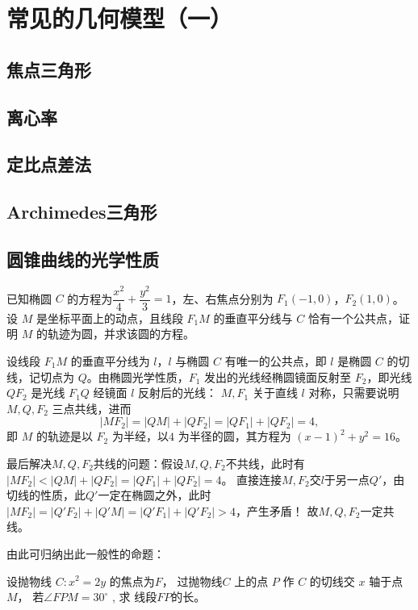 \section{常见的几何模型（一）}
\subsection{焦点三角形}
\clearpage
\subsection{离心率}
\clearpage
\subsection{定比点差法}
\clearpage
\subsection{Archimedes三角形}
\clearpage
\subsection{圆锥曲线的光学性质}
\begin{theorem}[椭圆的光学性质]
    
\end{theorem}
\begin{example}[2025八省联考18]
    已知椭圆 $C$ 的方程为\(\dfrac{x^2}{4}+\dfrac{y^2}{3}=1\)，左、右焦点分别为 $F_1(-1,0)$，$F_2(1,0)$。
  设 $M$ 是坐标平面上的动点，且线段 $F_1M$ 的垂直平分线与 $C$ 恰有一个公共点，证明 $M$ 的轨迹为圆，并求该圆的方程。
\end{example}
\begin{jie}
 设线段 $F_1M$ 的垂直平分线为 $l$，$l$ 与椭圆 $C$ 有唯一的公共点，即 $l$ 是椭圆 $C$ 的切线，记切点为 $Q$。由椭圆光学性质，$F_1$ 发出的光线经椭圆镜面反射至 $F_2$，即光线 $QF_2$ 是光线 $F_1Q$ 经镜面 $l$ 反射后的光线：
$M, F_1$ 关于直线 $l$ 对称，只需要说明$M, Q, F_2$ 三点共线，进而
\[
|MF_2| = |QM| + |QF_2| = |QF_1| + |QF_2| = 4,
\]
即 $M$ 的轨迹是以 $F_2$ 为半经，以$ 4$ 为半径的圆，其方程为 $(x-1)^2 + y^2 = 16$。

最后解决\(M,Q,F_2\)共线的问题：假设\(M,Q,F_2\)不共线，此时有$|MF_2| < |QM| + |QF_2| = |QF_1| + |QF_2| = 4$。
直接连接\(M, F_2\)交\(l\)于另一点\(Q'\)，由切线的性质，此\(Q'\)一定在椭圆之外，此时\(|MF_2|=|Q'F_2|+|Q'M|=|Q'F_1| + |Q'F_2|>4\)，产生矛盾！
故\(M,Q,F_2\)一定共线。
\end{jie}
由此可归纳出此一般性的命题：
\begin{proposition}
    
\end{proposition}
\begin{theorem}[双曲线的光学性质]
    
\end{theorem}
\begin{theorem}[抛物线的光学性质]
    
\end{theorem}
\begin{example}
 设抛物线 $C: x^{2}=2 y$ 的焦点为$ F$， 过抛物线$  C$ 上的点 $P$ 作 $ C $ 的切线交 
  $x$ 轴于点  $M $， 若$  \angle F P M=30^{\circ}$ , 求 
线段$F P$的长。
\end{example}

\clearpage

